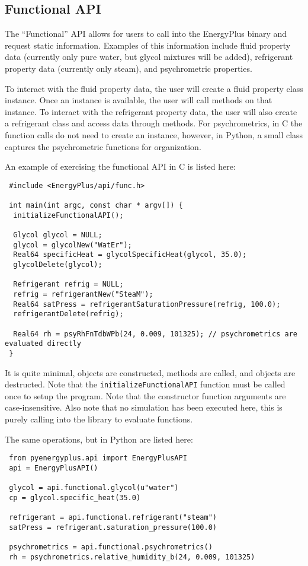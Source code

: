 \subsection{Functional API}\label{subsec:functional-api}

The ``Functional'' API allows for users to call into the EnergyPlus binary and request static information.
Examples of this information include fluid property data (currently only pure water, but glycol mixtures will be added), refrigerant property data (currently only steam), and psychrometric properties.

To interact with the fluid property data, the user will create a fluid property class instance.
Once an instance is available, the user will call methods on that instance.
To interact with the refrigerant property data, the user will also create a refrigerant class and access data through methods.
For psychrometrics, in C the function calls do not need to create an instance, however, in Python, a small class captures the psychrometric functions for organization.

An example of exercising the functional API in C is listed here:

\begin{lstlisting}
 #include <EnergyPlus/api/func.h>

 int main(int argc, const char * argv[]) {
  initializeFunctionalAPI();

  Glycol glycol = NULL;
  glycol = glycolNew("WatEr");
  Real64 specificHeat = glycolSpecificHeat(glycol, 35.0);
  glycolDelete(glycol);

  Refrigerant refrig = NULL;
  refrig = refrigerantNew("SteaM");
  Real64 satPress = refrigerantSaturationPressure(refrig, 100.0);
  refrigerantDelete(refrig);

  Real64 rh = psyRhFnTdbWPb(24, 0.009, 101325); // psychrometrics are evaluated directly
 }
\end{lstlisting}

It is quite minimal, objects are constructed, methods are called, and objects are destructed.
Note that the \verb=initializeFunctionalAPI= function must be called once to setup the program.
Note that the constructor function arguments are case-insensitive.
Also note that no simulation has been executed here, this is purely calling into the library to evaluate functions.

The same operations, but in Python are listed here:

\begin{lstlisting}
 from pyenergyplus.api import EnergyPlusAPI
 api = EnergyPlusAPI()

 glycol = api.functional.glycol(u"water")
 cp = glycol.specific_heat(35.0)

 refrigerant = api.functional.refrigerant("steam")
 satPress = refrigerant.saturation_pressure(100.0)

 psychrometrics = api.functional.psychrometrics()
 rh = psychrometrics.relative_humidity_b(24, 0.009, 101325)
\end{lstlisting}

